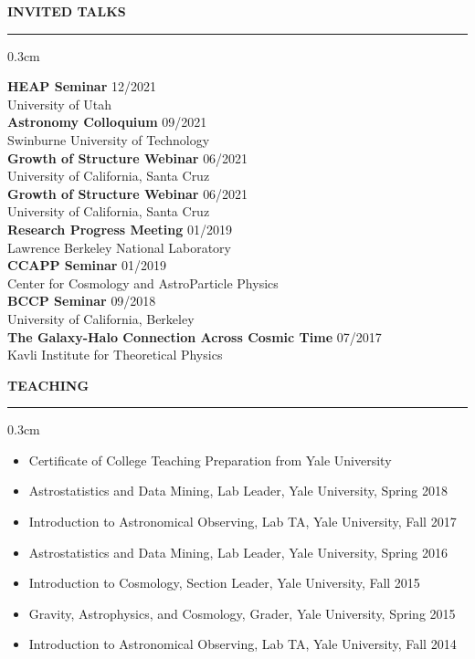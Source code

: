 \documentclass[12pt,letterpaper]{article}
\renewenvironment{section}[1]
  {
  \medskip
  {\color{blue} \MakeUppercase{\bf #1}}
  \smallskip
  \hrule
  \medskip
  \begin{adjustwidth}{0.3cm}{}
  }
  {
  \end{adjustwidth}
  }
\newcommand{\entry}[3]{{\bf #1} \hfill {#2} \\ {#3}}
\begin{document}
\begin{section}{Invited Talks}
  \entry{HEAP Seminar}{12/2021}{University of Utah} \medskip \\
  \entry{Astronomy Colloquium}{09/2021}{Swinburne University of Technology} \medskip \\
  \entry{Growth of Structure Webinar}{06/2021}{University of California, Santa Cruz} \medskip \\
  \entry{Growth of Structure Webinar}{06/2021}{University of California, Santa Cruz} \medskip \\
  \entry{Research Progress Meeting}{01/2019}{Lawrence Berkeley National Laboratory} \medskip \\
  \entry{CCAPP Seminar}{01/2019}{Center for Cosmology and AstroParticle Physics} \medskip \\
  \entry{BCCP Seminar}{09/2018}{University of California, Berkeley} \medskip \\
  \entry{The Galaxy-Halo Connection Across Cosmic Time}{07/2017}{Kavli Institute for Theoretical Physics}
\end{section}

\begin{section}{Teaching}
  \begin{itemize}[leftmargin=1.0cm, topsep=0pt, itemsep=0pt, partopsep=0pt, parsep=0pt]
    \item Certificate of College Teaching Preparation from Yale University
    \item Astrostatistics and Data Mining, Lab Leader, Yale University, Spring 2018
    \item Introduction to Astronomical Observing, Lab TA, Yale University, Fall 2017
    \item Astrostatistics and Data Mining, Lab Leader, Yale University, Spring 2016
    \item Introduction to Cosmology, Section Leader, Yale University, Fall 2015
    \item Gravity, Astrophysics, and Cosmology, Grader, Yale University, Spring 2015
    \item Introduction to Astronomical Observing, Lab TA, Yale University, Fall 2014
  \end{itemize}
\end{section}
\end{document}
